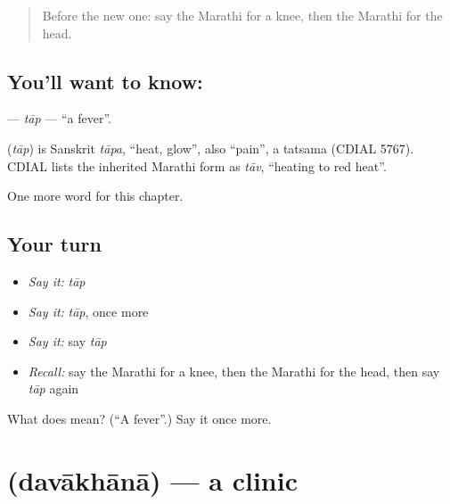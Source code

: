 \label{lesson:MR-C72-tap}



\begin{quote}
Before the new one: say the Marathi for a knee, then the Marathi for the head.
\end{quote}

\subsection*{You'll want to know: }
\textbf{} — \emph{tāp} — \textquotedblleft{}a fever\textquotedblright{}.

\begin{cousinweb}
\textbf{} (\emph{tāp}) is Sanskrit \emph{tāpa}, \textquotedblleft{}heat, glow\textquotedblright{}, also \textquotedblleft{}pain\textquotedblright{}, a tatsama (CDIAL 5767). CDIAL lists the inherited Marathi form as \emph{tāv}, \textquotedblleft{}heating to red heat\textquotedblright{}.
\end{cousinweb}

\begin{grammarlens}[title={What you've built}]
One more word for this chapter.
\end{grammarlens}

\subsection*{Your turn}
\begin{itemize}
\raggedright
  \item \emph{Say it:} \emph{tāp}
  \item \emph{Say it:} \emph{tāp}, once more
  \item \emph{Say it:} say \emph{tāp}
  \item \emph{Recall:} say the Marathi for a knee, then the Marathi for the head, then say \emph{tāp} again
\end{itemize}

\begin{tcolorbox}[breakable,colback=teal!4,colframe=teal!35!black,title={Before you move on}]
What does  mean? (\textquotedblleft{}A fever\textquotedblright{}.) Say it once more.
\end{tcolorbox}
\section[\texorpdfstring{\mr{दवाखाना} (davākhānā)}{दवाखाना (davākhānā)}]{ (davākhānā) — a clinic}

